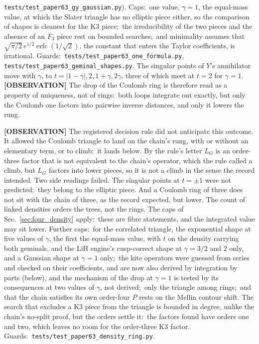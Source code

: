 \documentclass[aps,pra,twocolumn,superscriptaddress,longbibliography]{revtex4-2}
\begin{document}
\texttt{tests/test\_paper63\_gy\_gaussian.py}).
Caps:\ one value, $\gamma=1$, the equal-mass value, at which the Slater
triangle has no elliptic piece either, so the comparison of shapes is
cleanest for the K3 piece;\ the irreducibility of the two pieces and the
absence of an $F_3$ piece rest on bounded searches;\ and minimality assumes
that $\sqrt{\pi/2}\,e^{1/2}\operatorname{erfc}(1/\sqrt2)$, the constant
that enters the Taylor coefficients, is irrational.
Guards:\ \texttt{tests/test\_paper63\_one\_formula.py},
\texttt{tests/test\_paper63\_geminal\_shapes.py}.  The singular points of $Y$'s annihilator move with
$\gamma$, to $t=|1-\gamma|,2,1+\gamma,2\gamma$, three of which meet at $t=2$ for
$\gamma=1$.  \textbf{[OBSERVATION]} The drop of the Coulomb ring is therefore read as a property of
uniqueness, not of rings:\ both loops integrate out exactly, but only the
Coulomb one factors into pairwise inverse distances, and only it lowers the rung.

\textbf{[OBSERVATION]} The registered decision rule did not anticipate this
outcome.  It allowed the Coulomb triangle to land on the chain's rung, with or
without an elementary term, or to climb;\ it lands below.  By the rule's
letter $L_G$ is an order-three factor that is not equivalent to the chain's
operator, which the rule called a climb, but $L_G$ factors into lower pieces,
so it is not a climb in the sense the record intended.  Two side readings
failed.  The singular points at $t=\pm1$ were not predicted;\ they belong to
the elliptic piece.  And a Coulomb ring of three does not sit with the chain of
three, as the record expected, but lower.  The count of linked densities
orders the trees, not the rings.  The caps of Sec.~\ref{sec:four_density}
apply:\ these are fibre statements, and the integrated value may sit lower.
Further caps:\ for the correlated triangle, the exponential shape at
five values of $\gamma$, the first the equal-mass value, with $t$ on the
density carrying both geminals, and the LiH engine's cusp-correct shape at
$\gamma=3/2$ and $2$ only, and a Gaussian shape at $\gamma=1$ only;\ the kite operators were guessed from series and
checked on their coefficients, and are now also derived by integration by
parts (below), and the mechanism of the drop at $\gamma=1$
is tested by its consequences at two values of $\gamma$, not derived;\ only
the triangle among rings;\ and that the chain satisfies its own order-four $P$ rests on the
Mellin contour shift.  The search that excludes a K3 piece
from the triangle is bounded in degree, unlike the chain's no-split proof,
but the orders settle it:\ the
factors found have orders one and two, which leaves no room for the
order-three K3 factor.
Guards:\ \texttt{tests/test\_paper63\_density\_ring.py}.
\end{document}
